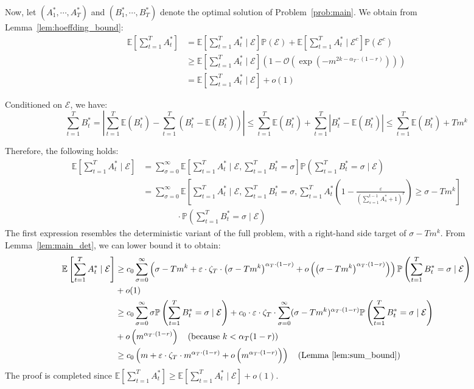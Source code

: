 \documentclass[nonblindrev]{informs3noheader}
\def\E{\mathbb{E}}
\def\P{\mathbb{P}}
\def\calE{\mathcal{E}}
\def\calO{\mathcal{O}}
\begin{document}
Now, let $(A^*_1,\cdots,A^*_T)$ and $(B^*_1,\cdots,B^*_T)$ denote the optimal solution of Problem~\eqref{prob:main}. We obtain from Lemma~\ref{lem:hoeffding_bound}:
\begin{align*}
    \E\left[\sum_{t=1}^T A^*_t\right]
    &=\E\left[\sum_{t=1}^T A^*_t \mid \calE\right]\P(\calE)+\E\left[\sum_{t=1}^T A^*_t \mid \calE^c\right]\P(\calE^c)\\
    &\geq \E\left[\sum_{t=1}^T A^*_t \mid \calE\right]\left(1-\calO(\exp(-m^{2k-\alpha_T\cdot(1-r)}))\right)\\
    &=\E\left[\sum_{t=1}^T A^*_t \mid \calE\right] + o(1)
\end{align*}

Conditioned on $\calE$, we have:
$$\sum_{t=1}^T B^*_t=\left|\sum_{t=1}^T \E(B^*_t)-\sum_{t=1}^T (B^*_t-\E(B^*_t))\right|\leq\sum_{t=1}^T \E(B^*_t)+\sum_{t=1}^T |B^*_t-\E(B^*_t)|\leq\sum_{t=1}^T \E(B^*_t)+Tm^k$$

Therefore, the following holds:
\begin{align*}
    \E\left[\sum_{t=1}^T A^*_t\mid \calE\right]
    &=\sum_{\sigma=0}^\infty \E\left[\sum_{t=1}^T A^*_t \mid \calE, \sum_{t=1}^T B^*_t=\sigma\right]\P\left(\sum_{t=1}^T B^*_t=\sigma \mid \calE \right)\\
    &=\sum_{\sigma=0}^\infty\E\left[\sum_{t=1}^T A^*_t \mid \calE, \sum_{t=1}^T B^*_t=\sigma, \sum_{t=1}^T A^*_t \left(1- \frac{\varepsilon}{\left(\sum_{s=1}^{t-1} A^*_s +1\right)^r}\right)\geq \sigma-Tm^k\right]\\&\qquad\qquad\cdot\P\left(\sum_{t=1}^T B^*_t=\sigma\mid \calE \right)
\end{align*}
The first expression resembles the deterministic variant of the full problem, with a right-hand side target of $\sigma-Tm^k$. From Lemma~\ref{lem:main_det}, we can lower bound it to obtain:
\begin{align*}
    \E\left[\sum_{t=1}^T A^*_t\mid \calE\right]
    &\geq c_0\sum_{\sigma=0}^\infty\left(\sigma-Tm^k+\varepsilon\cdot\zeta_T\cdot \left(\sigma-Tm^k\right)^{\alpha_T\cdot(1-r)}+ o\left(\left(\sigma-Tm^k\right)^{\alpha_T\cdot(1-r)}\right)\right)\P\left(\sum_{t=1}^T B^*_t=\sigma\mid \calE\right)\\
    &+ o(1)\\
    &\geq c_0\sum_{\sigma=0}^\infty\sigma\P\left(\sum_{t=1}^T B^*_t=\sigma\mid \calE\right)+c_0\cdot\varepsilon\cdot\zeta_T\cdot\sum_{\sigma=0}^\infty(\sigma-Tm^k)^{\alpha_T\cdot(1-r)}\P\left(\sum_{t=1}^T B^*_t=\sigma\mid \calE\right)\\
    &+ o\left(m^{\alpha_T\cdot(1-r)}\right)\quad\text{(because $k<\alpha_T(1-r)$)}\\
    &\geq c_0\left( m+\varepsilon\cdot \zeta_T \cdot m^{\alpha_T\cdot(1-r)} +  o\left(m^{\alpha_T\cdot(1-r)}\right)\right)
    \quad\text{(Lemma~\ref{lem:sum_bound})}
\end{align*}
The proof is completed since $\E\left[\sum_{t=1}^T A^*_t\right]\geq\E\left[\sum_{t=1}^T A^*_t \mid \calE\right] + o(1)$. 
\end{document}

